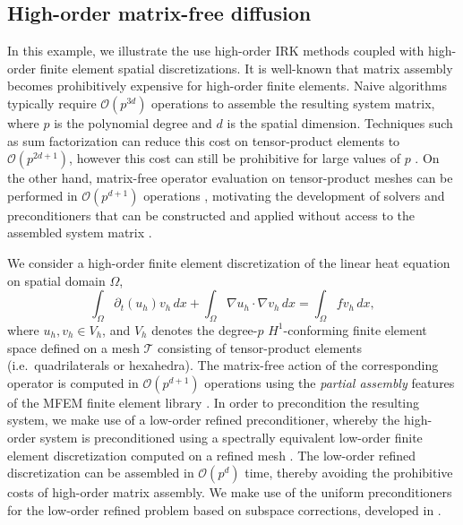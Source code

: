 \documentclass[review]{siamart}
\begin{document}
\subsection{High-order matrix-free diffusion}

In this example, we illustrate the use high-order IRK methods coupled with high-order finite element spatial discretizations.
It is well-known that matrix assembly becomes prohibitively expensive for high-order finite elements.
Naive algorithms typically require $\mathcal{O}(p^{3d})$ operations to assemble the resulting system matrix, where $p$ is the polynomial degree and $d$ is the spatial dimension.
Techniques such as sum factorization can reduce this cost on tensor-product elements to $\mathcal{O}(p^{2d+1})$, however this cost can still be prohibitive for large values of $p$ \cite{Melenk2001}.
On the other hand, matrix-free operator evaluation on tensor-product meshes can be performed in $\mathcal{O}(p^{d+1})$ operations \cite{Orszag1980}, motivating the development of solvers and preconditioners that can be constructed and applied without access to the assembled system matrix \cite{Kronbichler2019}.

We consider a high-order finite element discretization of the linear heat equation on spatial domain $\Omega$,
\[
	\int_\Omega \partial_t (u_h) v_h \, dx + \int_\Omega \nabla u_h \cdot \nabla v_h \, dx = \int_\Omega f v_h \, dx,
\]
where $u_h, v_h \in V_h$, and $V_h$ denotes the degree-$p$ $H^1$-conforming finite element space defined on a mesh $\mathcal{T}$ consisting of tensor-product elements (i.e.\ quadrilaterals or hexahedra).
The matrix-free action of the corresponding operator is computed in $\mathcal{O}(p^{d+1})$ operations using the \textit{partial assembly} features of the MFEM finite element library \cite{Anderson2020}.
In order to precondition the resulting system, we make use of a low-order refined preconditioner, whereby the high-order system is preconditioned using a spectrally equivalent low-order finite element discretization computed on a refined mesh \cite{Canuto2010}.
The low-order refined discretization can be assembled in $\mathcal{O}(p^d)$ time, thereby avoiding the prohibitive costs of high-order matrix assembly.
We make use of the uniform preconditioners for the low-order refined problem based on subspace corrections, developed in \cite{Pazner2019a}.
\end{document}

